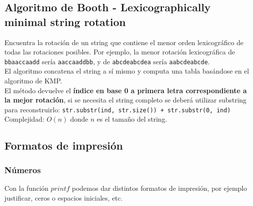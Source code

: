 \documentclass[10pt,letterpaper,twocolumn]{article}
\newcommand{\source}[1]{
	
	\dotfill
}
\begin{document}
	\subsection{Algoritmo de Booth - Lexicographically minimal string rotation}
		Encuentra la rotación de un string que contiene el menor orden lexicográfico de todas las rotaciones posibles. Por ejemplo, la menor rotación lexicográfica de \texttt{bbaaccaadd} sería \texttt{aaccaaddbb}, y de \texttt{abcdeabcdea} sería \texttt{aabcdeabcde}. \\
		El algoritmo concatena el string a sí mismo y computa una tabla basándose en el algoritmo de KMP.\\
		El método devuelve el \textbf{índice en base 0 a primera letra correspondiente a la mejor rotación}, si se necesita el string completo se deberá utilizar substring para reconstruirlo: \texttt{str.substr(ind, str.size()) + str.substr(0, ind)}\\		
Complejidad: $O(n)$ donde $n$ es el tamaño del string.
		\source{./src/booths.cpp}

	\subsection{Formatos de impresión}
		\subsubsection{Números}
		Con la función $printf$ podemos dar distintos formatos de impresión, por ejemplo justificar, ceros o espacios iniciales, etc.
			\source{./src/printFormat.cpp}
\end{document}

